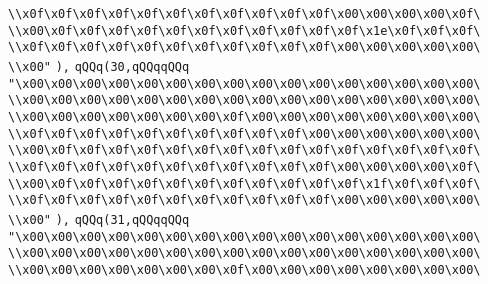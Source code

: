 \verb|\\x0f\x0f\x0f\x0f\x0f\x0f\x0f\x0f\x0f\x0f\x0f\x00\x00\x00\x00\x0f\|\newline
\verb|\\x00\x0f\x0f\x0f\x0f\x0f\x0f\x0f\x0f\x0f\x0f\x0f\x1e\x0f\x0f\x0f\|\newline
\verb|\\x0f\x0f\x0f\x0f\x0f\x0f\x0f\x0f\x0f\x0f\x0f\x00\x00\x00\x00\x00\|\newline
\verb|\\x00"|\newline
\verb|),|\newline
\verb|qQQq(30,qQQqqQQq|\newline
\verb|"\x00\x00\x00\x00\x00\x00\x00\x00\x00\x00\x00\x00\x00\x00\x00\x00\|\newline
\verb|\\x00\x00\x00\x00\x00\x00\x00\x00\x00\x00\x00\x00\x00\x00\x00\x00\|\newline
\verb|\\x00\x00\x00\x00\x00\x00\x00\x0f\x00\x00\x00\x00\x00\x00\x00\x00\|\newline
\verb|\\x0f\x0f\x0f\x0f\x0f\x0f\x0f\x0f\x0f\x0f\x00\x00\x00\x00\x00\x00\|\newline
\verb|\\x00\x0f\x0f\x0f\x0f\x0f\x0f\x0f\x0f\x0f\x0f\x0f\x0f\x0f\x0f\x0f\|\newline
\verb|\\x0f\x0f\x0f\x0f\x0f\x0f\x0f\x0f\x0f\x0f\x0f\x00\x00\x00\x00\x0f\|\newline
\verb|\\x00\x0f\x0f\x0f\x0f\x0f\x0f\x0f\x0f\x0f\x0f\x0f\x1f\x0f\x0f\x0f\|\newline
\verb|\\x0f\x0f\x0f\x0f\x0f\x0f\x0f\x0f\x0f\x0f\x0f\x00\x00\x00\x00\x00\|\newline
\verb|\\x00"|\newline
\verb|),|\newline
\verb|qQQq(31,qQQqqQQq|\newline
\verb|"\x00\x00\x00\x00\x00\x00\x00\x00\x00\x00\x00\x00\x00\x00\x00\x00\|\newline
\verb|\\x00\x00\x00\x00\x00\x00\x00\x00\x00\x00\x00\x00\x00\x00\x00\x00\|\newline
\verb|\\x00\x00\x00\x00\x00\x00\x00\x0f\x00\x00\x00\x00\x00\x00\x00\x00\|\newline
